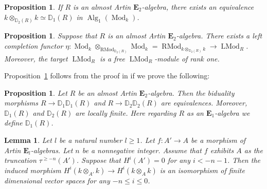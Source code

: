 \documentclass[leqno,12pt]{amsart}
\theoremstyle{plain}
\newtheorem{Proposition}[Theorem]{Proposition}
\newtheorem{Lemma}[Theorem]{Lemma}
\theoremstyle{definition}
\newcommand{\DD}{\mathbb{D}}
\newcommand{\Mod}{\operatorname{Mod}}
\newcommand{\Alg}{\operatorname{Alg}}
\newcommand{\eone}{\mathbf{E}_1}
\newcommand{\etwo}{\mathbf{E}_2}
\newcommand{\LMod}{\operatorname{LMod}}
\newcommand{\RMod}{\operatorname{RMod}}
\begin{document}
\begin{Proposition}
\label{dbar}
If $R$ is an almost Artin $\etwo$-algebra, there
exists an equivalence $k\otimes_{\DD_2(R)}k\simeq \DD_1(R)$ in $\Alg_1(\Mod_k)$.
\end{Proposition}



\begin{Proposition}
\label{leftcomp2}
Suppose that $R$ is an almost Artin $\etwo$-algebra.
There exists a left completion functor $\eta:\Mod_k\otimes_{\RMod_{\DD_2(R)}}\Mod_k=\RMod_{k\otimes_{\DD_2(R)}k}\to \LMod_R$.
Moreover, the target $\LMod_R$ is a free $\LMod_R$-module of rank one.
\end{Proposition}



Proposition~\ref{dbar}
follows from the proof in \cite[Lemma 3.13]{IH}
if we prove the following:

\begin{Proposition}
\label{almostbiduality}
Let $R$ be an almost Artin $\etwo$-algebra.
Then the biduality morphisms $R\to \DD_1\DD_1(R)$ and $R\to \DD_2\DD_2(R)$ are equivalences.
Moreover, $\DD_1(R)$ and $\DD_2(R)$ are locally finite. Here regarding $R$ as an $\eone$-algebra we define $\DD_1(R)$. 
\end{Proposition}



\begin{Lemma}
\label{onestepbarisomo}
Let $l$ be a natural number $l\ge1$.
Let $f:A'\to A$ be a morphism of Artin $\mathbf{E}_l$-algebras.
Let $n$ be a nonnegative integer.
Assume that $f$ exhibits $A$ as the truncation $\tau^{\ge -n}(A')$. 
Suppose that $H^{i}(A')=0$ for any $i<-n-1$.
Then the induced morphism $H^i(k\otimes_{A'}k)\to H^i(k\otimes_Ak)$ is an isomorphism of finite dimensional vector spaces for any $-n\le i\le 0$.
\end{Lemma}
\end{document}
